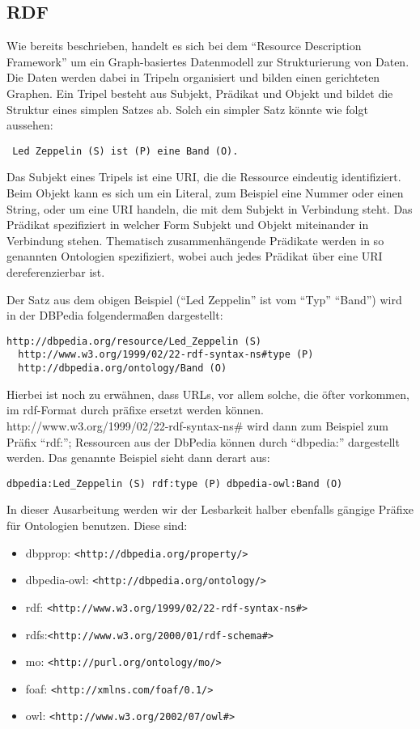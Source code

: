 \subsection{RDF}

Wie bereits beschrieben, handelt es sich bei dem “Resource Description Framework” um ein Graph-basiertes Datenmodell zur Strukturierung von Daten. Die Daten werden dabei in Tripeln organisiert und bilden einen gerichteten Graphen. Ein Tripel besteht aus Subjekt, Prädikat und Objekt und bildet die Struktur eines simplen Satzes ab. Solch ein simpler Satz könnte wie folgt aussehen:

\begin{lstlisting}
 Led Zeppelin (S) ist (P) eine Band (O).
\end{lstlisting}


Das Subjekt eines Tripels ist eine URI, die die Ressource eindeutig identifiziert. Beim Objekt kann es sich um ein Literal, zum Beispiel eine Nummer oder einen String, oder um eine URI handeln, die mit dem Subjekt in Verbindung steht. Das Prädikat spezifiziert in welcher Form Subjekt und Objekt miteinander in Verbindung stehen. Thematisch zusammenhängende Prädikate werden in so genannten Ontologien spezifiziert, wobei auch jedes Prädikat über eine URI dereferenzierbar ist.

Der Satz aus dem obigen Beispiel (“Led Zeppelin” ist vom “Typ” “Band”) wird in der DBPedia folgendermaßen dargestellt:

\begin{lstlisting}
http://dbpedia.org/resource/Led_Zeppelin (S) 
  http://www.w3.org/1999/02/22-rdf-syntax-ns#type (P)
  http://dbpedia.org/ontology/Band (O)
\end{lstlisting}
Hierbei ist noch zu erwähnen, dass URLs, vor allem solche, die öfter vorkommen, im rdf-Format durch präfixe ersetzt werden können. http://www.w3.org/1999/02/22-rdf-syntax-ns\# wird dann zum Beispiel zum Präfix “rdf:”; Ressourcen aus der DbPedia können durch “dbpedia:” dargestellt werden.
Das genannte Beispiel sieht dann derart aus:

\begin{lstlisting}
dbpedia:Led_Zeppelin (S) rdf:type (P) dbpedia-owl:Band (O)
\end{lstlisting}

In dieser Ausarbeitung werden wir der Lesbarkeit halber ebenfalls gängige Präfixe für Ontologien benutzen. Diese sind:
\begin{itemize}
\item dbpprop: \tt <http://dbpedia.org/property/>
\item dbpedia-owl: \tt <http://dbpedia.org/ontology/>
\item rdf: \tt <http://www.w3.org/1999/02/22-rdf-syntax-ns\#>
\item rdfs:\tt <http://www.w3.org/2000/01/rdf-schema\#>
\item mo: \tt <http://purl.org/ontology/mo/>
\item foaf: \tt <http://xmlns.com/foaf/0.1/>
\item owl: \tt <http://www.w3.org/2002/07/owl\#>
\end{itemize}

